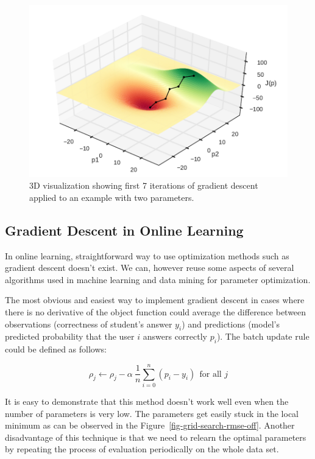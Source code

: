 \begin{figure}[htbp]
  \centering
  \includegraphics[width=\textwidth]{img/gradient-descent}
  \caption{3D visualization showing first 7 iterations of gradient descent applied to an example with two parameters.}
  \label{fig-gradient-descent}
\end{figure}

\subsection*{Gradient Descent in Online Learning}

In online learning, straightforward way to use optimization methods such as gradient descent doesn't exist. We can, however reuse some aspects of several algorithms used in machine learning and data mining for parameter optimization.

The most obvious and easiest way to implement gradient descent in cases where there is no derivative of the object function could average the difference between observations (correctness of student's answer $y_i$) and predictions (model's predicted probability that the user $i$ answers correctly $p_i$). The batch update rule could be defined as follows:

\begin{equation} \label{online-learning-batch-rule}
 \rho_j \gets \rho_j - \alpha~\frac{1}{n}\sum_{i=0}^n (p_i - y_i)~~\text{for all } j
\end{equation}

It is easy to demonstrate that this method doesn't work well even when the number of parameters is very low. The parameters get easily stuck in the local minimum as can be observed in the Figure~\ref{fig-grid-search-rmse-off}. Another disadvantage of this technique is that we need to relearn the optimal parameters by repeating the process of evaluation periodically on the whole data set.

